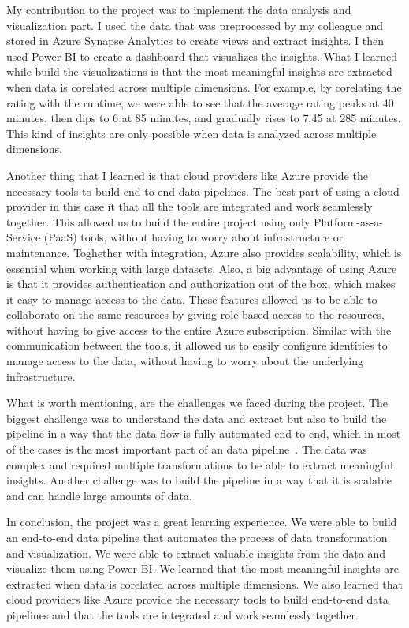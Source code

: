 \documentclass[a4paper,12pt]{article}
\begin{document}
My contribution to the project was to implement the data analysis and visualization part. I used the data that was preprocessed by my colleague
and stored in Azure Synapse Analytics to create views and extract insights. I then used Power BI to create a dashboard that visualizes the insights.
What I learned while build the visualizations is that the most meaningful insights are extracted when data is corelated across multiple dimensions.
For example, by corelating the rating with the runtime, we were able to see that the average rating peaks at 40 minutes, then dips to 6 at 85 minutes,
and gradually rises to 7.45 at 285 minutes. This kind of insights are only possible when data is analyzed across multiple dimensions.

Another thing that I learned is that cloud providers like Azure provide the necessary tools to build end-to-end data pipelines. The best
part of using a cloud provider in this case it that all the tools are integrated and work seamlessly together. This allowed us to build
the entire project using only Platform-as-a-Service (PaaS) tools, without having to worry about infrastructure or maintenance. Toghether with
integration, Azure also provides scalability, which is essential when working with large datasets. Also, a big advantage of using Azure is
that it provides authentication and authorization out of the box, which makes it easy to manage access to the data. These features allowed us
to be able to collaborate on the same resources by giving role based access to the resources, without having to give access to the entire
Azure subscription. Similar with the communication between the tools, it allowed us to easily configure identities to manage access to the
data, without having to worry about the underlying infrastructure.

What is worth mentioning, are the challenges we faced during the project. The biggest challenge was to understand the data and extract but also
to build the pipeline in a way that the data flow is fully automated end-to-end, which in most of the cases is the most important part of an
data pipeline~\cite{modelling-data-pipelines}. The data was complex and required multiple transformations
to be able to extract meaningful insights. Another challenge was to build the pipeline in a way that it is scalable and can handle large amounts
of data.

In conclusion, the project was a great learning experience. We were able to build an end-to-end data pipeline that automates the process of data
transformation and visualization. We were able to extract valuable insights from the data and visualize them using Power BI. We learned that
the most meaningful insights are extracted when data is corelated across multiple dimensions. We also learned that cloud providers like Azure
provide the necessary tools to build end-to-end data pipelines and that the tools are integrated and work seamlessly together.
\end{document}
